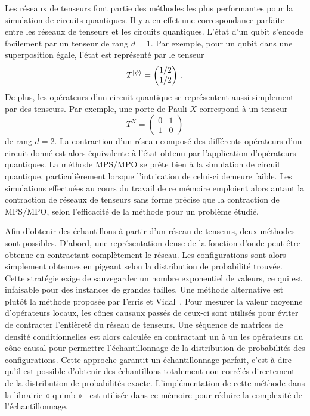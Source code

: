 Les réseaux de tenseurs font partie des méthodes les plus performantes pour la simulation de circuits quantiques. Il y a en effet une correspondance parfaite entre les réseaux de tenseurs et les circuits quantiques. L'état d'un qubit s'encode facilement par un tenseur de rang $d = 1$. Par exemple, pour un qubit dans une superposition égale, l'état est représenté par le tenseur
\begin{equation}
    T^{\ket{\psi}} = 
    \begin{pmatrix}
        1 / 2 \\
        1 / 2
    \end{pmatrix} \,.
\end{equation}
De plus, les opérateurs d'un circuit quantique se représentent aussi simplement par des tenseurs. Par exemple, une porte de Pauli $X$ correspond à un tenseur 
\begin{equation}
    T^{X} = 
    \begin{pmatrix}
        0 & 1 \\
        1 & 0
    \end{pmatrix}
\end{equation}
de rang $d = 2$. La contraction d'un réseau composé des différents opérateurs d'un circuit donné est alors équivalente à l'état obtenu par l'application d'opérateurs quantiques. La méthode MPS/MPO se prête bien à la simulation de circuit quantique, particulièrement lorsque l'intrication de celui-ci demeure faible. Les simulations effectuées au cours du travail de ce mémoire emploient alors autant la contraction de réseaux de tenseurs sans forme précise que la contraction de MPS/MPO, selon l'efficacité de la méthode pour un problème étudié.

Afin d'obtenir des échantillons à partir d'un réseau de tenseurs, deux méthodes sont possibles. D'abord, une représentation dense de la fonction d'onde peut être obtenue en contractant complètement le réseau. Les configurations sont alors simplement obtenues en pigeant selon la distribution de probabilité trouvée. Cette stratégie exige de sauvegarder un nombre exponentiel de valeurs, ce qui est infaisable pour des instances de grandes tailles. Une méthode alternative est plutôt la méthode proposée par Ferris et Vidal~\cite{ferrisPerfectSamplingUnitary2012}. Pour mesurer la valeur moyenne d'opérateurs locaux, les cônes causaux passés de ceux-ci sont utilisés pour éviter de contracter l'entièreté du réseau de tenseurs. Une séquence de matrices de densité conditionnelles est alors calculée en contractant un à un les opérateurs du cône causal pour permettre l'échantillonnage de la distribution de probabilités des configurations. Cette approche garantit un échantillonnage parfait, c'est-à-dire qu'il est possible d'obtenir des échantillons totalement non corrélés directement de la distribution de probabilités exacte. L'implémentation de cette méthode dans la librairie « quimb »~\cite{grayQuimbPythonPackage2018} est utilisée dans ce mémoire pour réduire la complexité de l'échantillonnage.


